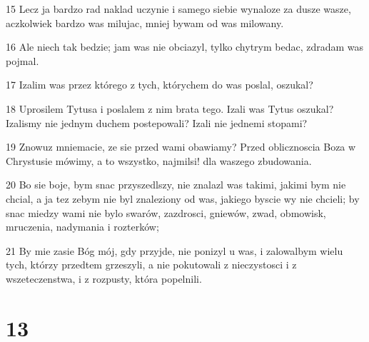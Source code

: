 \par 15 Lecz ja bardzo rad naklad uczynie i samego siebie wynaloze za dusze wasze, aczkolwiek bardzo was milujac, mniej bywam od was milowany.
\par 16 Ale niech tak bedzie; jam was nie obciazyl, tylko chytrym bedac, zdradam was pojmal.
\par 17 Izalim was przez którego z tych, którychem do was poslal, oszukal?
\par 18 Uprosilem Tytusa i poslalem z nim brata tego. Izali was Tytus oszukal? Izalismy nie jednym duchem postepowali? Izali nie jednemi stopami?
\par 19 Znowuz mniemacie, ze sie przed wami obawiamy? Przed oblicznoscia Boza w Chrystusie mówimy, a to wszystko, najmilsi! dla waszego zbudowania.
\par 20 Bo sie boje, bym snac przyszedlszy, nie znalazl was takimi, jakimi bym nie chcial, a ja tez zebym nie byl znaleziony od was, jakiego byscie wy nie chcieli; by snac miedzy wami nie bylo swarów, zazdrosci, gniewów, zwad, obmowisk, mruczenia, nadymania i rozterków;
\par 21 By mie zasie Bóg mój, gdy przyjde, nie ponizyl u was, i zalowalbym wielu tych, którzy przedtem grzeszyli, a nie pokutowali z nieczystosci i z wszeteczenstwa, i z rozpusty, która popelnili.

\chapter{13}

